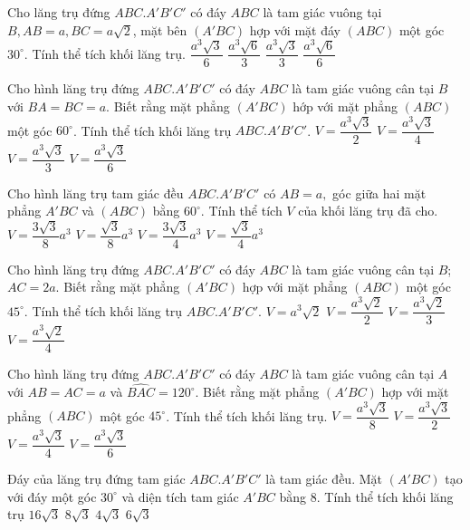 \begin{ex}%
	Cho lăng trụ đứng $ABC.A'B'C'$ có đáy $ABC$ là tam giác vuông tại $B, AB=a, BC=a\sqrt{2}$, mặt bên $(A'BC)$ hợp với mặt đáy $(ABC)$ một góc $30^{\circ}$. Tính thể tích khối lăng trụ. 
	\choice
	{$\dfrac{a^3\sqrt{3}}{6}$}
	{$\dfrac{a^3\sqrt{6}}{3}$}
	{$\dfrac{a^3\sqrt{3}}{3}$}
	{\True $\dfrac{a^3\sqrt{6}}{6}$}
\end{ex}

\begin{ex}%
	Cho hình lăng trụ đứng $ABC.A'B'C'$ có đáy $ABC$ là tam giác vuông cân tại $B$ với $BA=BC=a$. Biết rằng mặt phẳng $(A'BC)$ hớp với mặt phẳng $(ABC)$ một góc $60^{\circ}$. Tính thể tích khối lăng trụ $ABC.A'B'C'$. 
	\choice
	{\True $V=\dfrac{a^3\sqrt{3}}{2}$}
	{$V=\dfrac{a^3\sqrt{3}}{4}$}
	{$V=\dfrac{a^3\sqrt{3}}{3}$}
	{$V=\dfrac{a^3\sqrt{3}}{6}$}
\end{ex}

\begin{ex}%
	Cho hình lăng trụ tam giác đều $ABC.A'B'C'$ có $AB=a,$ góc giữa hai mặt phẳng $A'BC$ và $(ABC)$ bằng $60^{\circ}$. Tính thể tích $V$ của khối lăng trụ đã cho. 
	\choice
	{\True $V=\dfrac{3\sqrt{3}}{8}a^3$}
	{$V=\dfrac{\sqrt{3}}{8}a^3$}
	{$V=\dfrac{3\sqrt{3}}{4}a^3$}
	{$V=\dfrac{\sqrt{3}}{4}a^3$}
\end{ex}

\begin{ex}%
	Cho hình lăng trụ đứng $ABC.A'B'C'$ có đáy $ABC$ là tam giác vuông cân tại $B$; $AC=2a$. Biết rằng mặt phẳng $(A'BC)$ hợp với mặt phẳng $(ABC)$ một góc $45^{\circ}$. Tính thể tích khối lăng trụ $ABC.A'B'C'$. 
	\choice
	{\True $V=a^3\sqrt{2}$}
	{$V=\dfrac{a^3\sqrt{2}}{2}$}
	{$V=\dfrac{a^3\sqrt{2}}{3}$}
	{$V=\dfrac{a^3\sqrt{2}}{4}$}
\end{ex}

\begin{ex}%
	Cho hình lăng trụ đứng $ABC.A'B'C'$ có đáy $ABC$ là tam giác vuông cân tại $A$ với $AB=AC=a$ và $\widehat{BAC}=120^{\circ}$. Biết rằng mặt phẳng $(A'BC)$ hợp với mặt phẳng $(ABC)$ một góc $45^{\circ}$. Tính thể tích khối lăng trụ. 
	\choice
	{\True $V=\dfrac{a^3\sqrt{3}}{8}$}
	{$V=\dfrac{a^3\sqrt{3}}{2}$}
	{$V=\dfrac{a^3\sqrt{3}}{4}$}
	{$V=\dfrac{a^3\sqrt{3}}{6}$}
\end{ex}

\begin{ex}%
	Đáy của lăng trụ đứng tam giác $ABC.A'B'C'$ là tam giác đều. Mặt $(A'BC)$ tạo với đáy một góc $30^{\circ}$ và diện tích tam giác $A'BC$ bằng $8$. Tính thể tích khối lăng trụ
	\choice
	{$16\sqrt{3}$}
	{\True $8\sqrt{3}$}
	{$4\sqrt{3}$}
	{$6\sqrt{3}$}
\end{ex}


